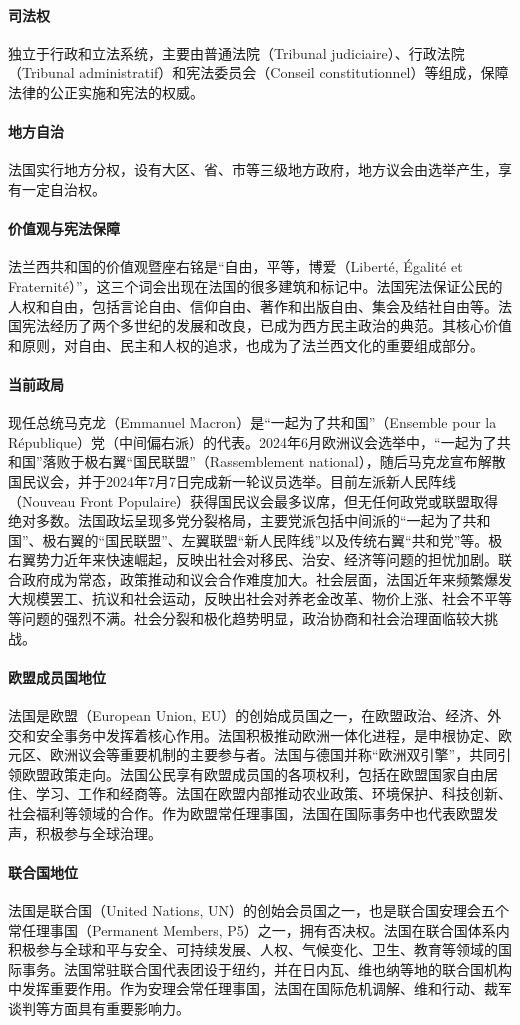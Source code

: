 \paragraph{司法权} 独立于行政和立法系统，主要由普通法院（Tribunal judiciaire）、行政法院（Tribunal administratif）和宪法委员会（Conseil constitutionnel）等组成，保障法律的公正实施和宪法的权威。

\paragraph{地方自治} 法国实行地方分权，设有大区、省、市等三级地方政府，地方议会由选举产生，享有一定自治权。

\paragraph{价值观与宪法保障} 法兰西共和国的价值观暨座右铭是“自由，平等，博爱（Liberté, Égalité et Fraternité）”，这三个词会出现在法国的很多建筑和标记中。法国宪法保证公民的人权和自由，包括言论自由、信仰自由、著作和出版自由、集会及结社自由等。法国宪法经历了两个多世纪的发展和改良，已成为西方民主政治的典范。其核心价值和原则，对自由、民主和人权的追求，也成为了法兰西文化的重要组成部分。

\paragraph{当前政局} 现任总统马克龙（Emmanuel Macron）是“一起为了共和国”（Ensemble pour la République）党（中间偏右派）的代表。2024年6月欧洲议会选举中，“一起为了共和国”落败于极右翼“国民联盟”（Rassemblement national），随后马克龙宣布解散国民议会，并于2024年7月7日完成新一轮议员选举。目前左派新人民阵线（Nouveau Front Populaire）获得国民议会最多议席，但无任何政党或联盟取得绝对多数。法国政坛呈现多党分裂格局，主要党派包括中间派的“一起为了共和国”、极右翼的“国民联盟”、左翼联盟“新人民阵线”以及传统右翼“共和党”等。极右翼势力近年来快速崛起，反映出社会对移民、治安、经济等问题的担忧加剧。联合政府成为常态，政策推动和议会合作难度加大。社会层面，法国近年来频繁爆发大规模罢工、抗议和社会运动，反映出社会对养老金改革、物价上涨、社会不平等等问题的强烈不满。社会分裂和极化趋势明显，政治协商和社会治理面临较大挑战。

\paragraph{欧盟成员国地位} 法国是欧盟（European Union, EU）的创始成员国之一，在欧盟政治、经济、外交和安全事务中发挥着核心作用。法国积极推动欧洲一体化进程，是申根协定、欧元区、欧洲议会等重要机制的主要参与者。法国与德国并称“欧洲双引擎”，共同引领欧盟政策走向。法国公民享有欧盟成员国的各项权利，包括在欧盟国家自由居住、学习、工作和经商等。法国在欧盟内部推动农业政策、环境保护、科技创新、社会福利等领域的合作。作为欧盟常任理事国，法国在国际事务中也代表欧盟发声，积极参与全球治理。

\paragraph{联合国地位} 法国是联合国（United Nations, UN）的创始会员国之一，也是联合国安理会五个常任理事国（Permanent Members, P5）之一，拥有否决权。法国在联合国体系内积极参与全球和平与安全、可持续发展、人权、气候变化、卫生、教育等领域的国际事务。法国常驻联合国代表团设于纽约，并在日内瓦、维也纳等地的联合国机构中发挥重要作用。作为安理会常任理事国，法国在国际危机调解、维和行动、裁军谈判等方面具有重要影响力。
